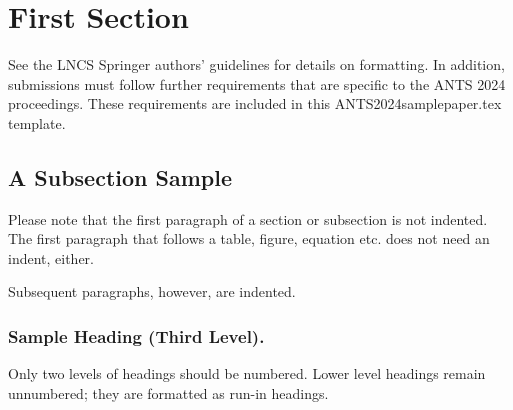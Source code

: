 \documentclass[runningheads]{llncs}
\begin{document}
%
%
\maketitle              %
%
\begin{abstract}
The abstract should briefly summarize the contents of the paper in
150--250 words.

\end{abstract}
%
%
%
\section{First Section}
See the LNCS Springer authors’ guidelines for details on formatting. 
In addition, submissions must follow further requirements that are
specific to the ANTS 2024 proceedings. These requirements are included
in this ANTS2024samplepaper.tex template.


\subsection{A Subsection Sample}
Please note that the first paragraph of a section or subsection is
not indented. The first paragraph that follows a table, figure,
equation etc. does not need an indent, either.

Subsequent paragraphs, however, are indented.

\subsubsection{Sample Heading (Third Level).}
Only two levels of headings should be numbered. Lower level headings
remain unnumbered; they are formatted as run-in headings.
\end{document}
